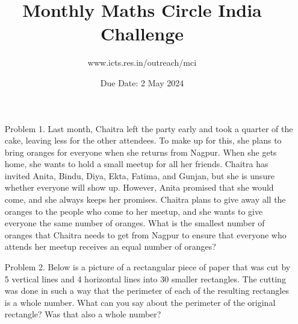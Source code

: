 \documentclass[a4paper,12pt]{article}
\title{Monthly Maths Circle India Challenge}
\author{www.icts.res.in/outreach/mci}
\date{Due Date: 2 May 2024}
\begin{document}
\maketitle
\thispagestyle{empty}
\begin{enumerate}
    \item[Problem 1.] Last month, Chaitra left the party early and took a quarter of the cake, leaving less for the other attendees. To make up for this, she plans to bring oranges for everyone when she returns from Nagpur. When she gets home, she wants to hold a small meetup for all her friends. Chaitra has invited Anita, Bindu, Diya, Ekta, Fatima, and Gunjan, but she is unsure whether everyone will show up. However, Anita promised that she would come, and she always keeps her promises. Chaitra plans to give away all the oranges to the people who come to her meetup, and she wants to give everyone the same number of oranges. What is the smallest number of oranges that Chaitra needs to get from Nagpur to ensure that everyone who attends her meetup receives an equal number of oranges?
    \item[Problem 2.] Below is a picture of a rectangular piece of paper that was cut by
    5 vertical lines and 4 horizontal lines into 30 smaller rectangles. The cutting was done in such a way that the perimeter of each of the resulting rectangles is a whole number. What can you say about the perimeter of the original rectangle? Was that also a whole number?
    \begin{figure}[h]
        \centering
    \end{figure}
\end{enumerate}
\end{document}
